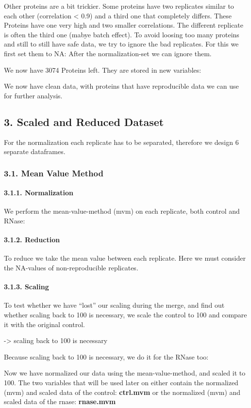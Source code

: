 \documentclass[
]{article}
\begin{document}
Other proteins are a bit trickier. Some proteins have two replicates
similar to each other (correlation \textless{} 0.9) and a third one that
completely differs. These Proteins have one very high and two smaller
correlations. The different replicate is often the third one (mabye
batch effect). To avoid loosing too many proteins and still to still
have safe data, we try to ignore the bad replicates. For this we first
set them to NA: After the normalization-set we can ignore them.

We now have 3074 Proteins left. They are stored in new variables:

We now have clean data, with proteins that have reproducible data we can
use for further analysis.

\hypertarget{scaled-and-reduced-dataset}{%
\subsection{3. Scaled and Reduced
Dataset}\label{scaled-and-reduced-dataset}}

For the normalization each replicate has to be separated, therefore we
design 6 separate dataframes.

\hypertarget{mean-value-method}{%
\subsubsection{3.1. Mean Value Method}\label{mean-value-method}}

\hypertarget{normalization}{%
\paragraph{3.1.1. Normalization}\label{normalization}}

We perform the mean-value-method (mvm) on each replicate, both control
and RNase:

\hypertarget{reduction}{%
\paragraph{3.1.2. Reduction}\label{reduction}}

To reduce we take the mean value between each replicate. Here we must
consider the NA-values of non-reproducible replicates.

\hypertarget{scaling}{%
\paragraph{3.1.3. Scaling}\label{scaling}}

To test whether we have ``lost'' our scaling during the merge, and find
out whether scaling back to 100 is necessary, we scale the control to
100 and compare it with the original control.

-\textgreater{} scaling back to 100 is necessary

Because scaling back to 100 is necessary, we do it for the RNase too:

Now we have normalized our data using the mean-value-method, and scaled
it to 100. The two variables that will be used later on either contain
the normalized (mvm) and scaled data of the control: \textbf{ctrl.mvm}
or the normalized (mvm) and scaled data of the rnase: \textbf{rnase.mvm}
\end{document}
